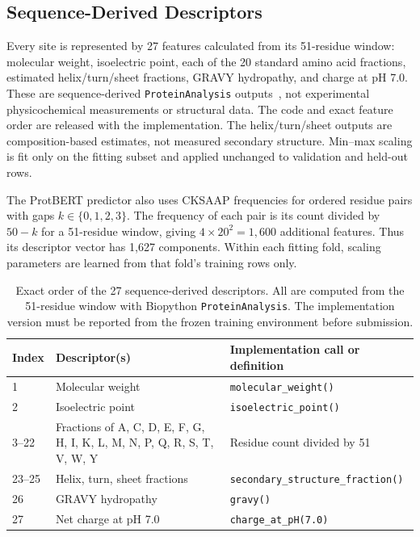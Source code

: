 \documentclass[twocolumn]{article}
\begin{document}
\subsection{Sequence-Derived Descriptors}
Every site is represented by 27 features calculated from its 51-residue
window: molecular weight, isoelectric point, each of the 20 standard amino
acid fractions, estimated helix/turn/sheet fractions, GRAVY hydropathy, and
charge at pH 7.0. These are sequence-derived \texttt{ProteinAnalysis}
outputs~\cite{cock2009biopython}, not experimental physicochemical
measurements or structural data.
The code and exact feature order are released with the implementation.
The helix/turn/sheet outputs are composition-based estimates, not measured
secondary structure. Min--max scaling is fit only on the fitting subset and applied
unchanged to validation and held-out rows.

The ProtBERT predictor also uses CKSAAP frequencies for ordered residue
pairs with gaps $k\in\{0,1,2,3\}$. The frequency of each pair is its
count divided by $50-k$ for a 51-residue window, giving $4\times20^2=1,600$
additional features. Thus its descriptor vector has 1,627 components.
Within each fitting fold, scaling parameters are learned from that fold's
training rows only.

\begin{table}[t]
\centering
\caption{Exact order of the 27 sequence-derived descriptors. All are
computed from the 51-residue window with Biopython
\texttt{ProteinAnalysis}. The implementation version must be reported
from the frozen training environment before submission.}
\label{tab:features}
\small
\begin{tabular}{@{}p{}p{}p{}@{}}\toprule
Index & Descriptor(s) & Implementation call or definition\\\midrule
1 & Molecular weight & \texttt{molecular\_weight()}\\
2 & Isoelectric point & \texttt{isoelectric\_point()}\\
3--22 & Fractions of A, C, D, E, F, G, H, I, K, L, M, N, P, Q, R, S, T, V, W, Y &
  Residue count divided by 51\\
23--25 & Helix, turn, sheet fractions & \texttt{secondary\_structure\_fraction()}\\
26 & GRAVY hydropathy & \texttt{gravy()}\\
27 & Net charge at pH 7.0 & \texttt{charge\_at\_pH(7.0)}\\\bottomrule
\end{tabular}
\end{table}
\end{document}
